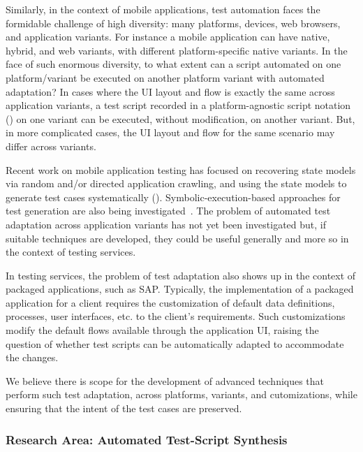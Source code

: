 Similarly, in the context of mobile applications, test automation faces the
formidable challenge of high diversity: many platforms, devices, web browsers,
and application variants. For instance a mobile application can have native,
hybrid, and web variants, with different platform-specific native variants. In
the face of such enormous diversity, to what extent can a script automated on
one platform/variant be executed on another platform variant with automated
adaptation?  In cases where the UI layout and flow is exactly the same across
application variants, a test script recorded in a platform-agnostic script
notation (\eg \cite{PerfectoScriptOnce}) on one variant can be executed, without
modification, on another variant.  But, in more complicated cases, the UI layout
and flow for the same scenario may differ across variants.

Recent work on mobile application testing has focused on recovering state models
via random and/or directed application crawling, and using the state models to
generate test cases systematically (\eg \cite{Amalfitano:2011, Amalfitano:2012,
  Choi:2013, Hu:2011, Joorabchi:2012, Yang:2013}). Symbolic-execution-based
approaches for test generation are also being investigated~\cite{Anand:2012,
  Mirzaei:2012}. The problem of automated test adaptation across application
variants has not yet been investigated but, if suitable techniques are
developed, they could be useful generally and more so in the context of testing
services.

In testing services, the problem of test adaptation also shows up in the context
of packaged applications, such as SAP. Typically, the implementation of a
packaged application for a client requires the customization of default data
definitions, processes, user interfaces, etc. to the client's requirements. Such
customizations modify the default flows available through the application UI,
raising the question of whether test scripts can be automatically adapted to
accommodate the changes.

We believe there is scope for the development of advanced techniques that
perform such test adaptation, across platforms, variants, and cutomizations,
while ensuring that the intent of the test cases are preserved.

\subsubsection*{Research Area: Automated Test-Script Synthesis}

